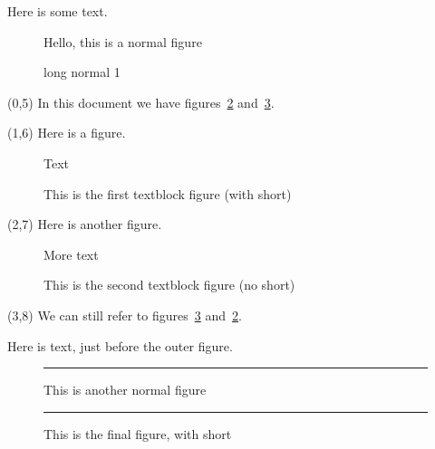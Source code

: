 \documentclass{article}
\begin{document}
\listoffigures

Here is some text.

\begin{figure}
Hello, this is a normal figure
\caption[short normal 1]{\label{normal1}long normal 1}
\end{figure}

\begin{textblock}{5}(0,5)
In this document we have figures~\ref{figa} and~\ref{figb}.
\end{textblock}

 
\begin{textblock}{5}(1,6)
  Here is a figure.
  \begin{figure}
  Text
  \caption[short textblock caption]{This is the first textblock figure (with short)}
  \label{figa}
  \end{figure}
\end{textblock}
 

\begin{textblock}{5}(2,7)
  Here is another figure.%
  \begin{figure}
  More text
  \caption{\label{figb}This is the second textblock figure (no short)}
  \end{figure}
\end{textblock}

\begin{textblock}{5}(3,8)
  We can still refer to figures~\ref{figb} and~\ref{figa}.
\end{textblock}

Here is text, just before the outer figure.
\begin{figure}
\hrule
This is another normal figure
\hrule
\caption[short normal 2]{\label{figc}This is the final figure, with short}
\end{figure}
\end{document}
